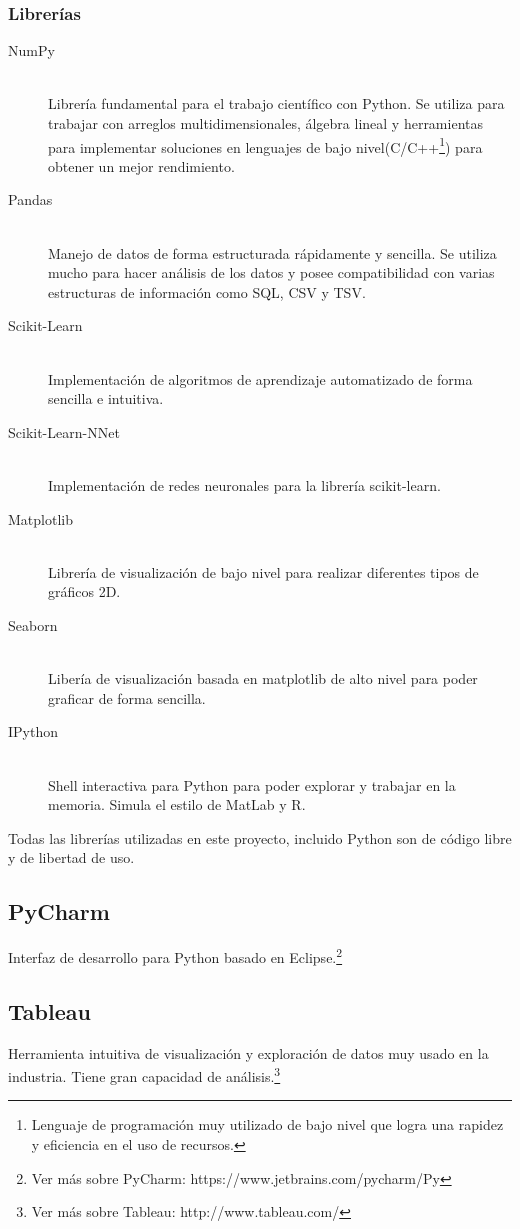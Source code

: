 \subsubsection{Librerías}
\begin{description}
  \item[NumPy] \hfill \\
  Librería fundamental para el trabajo científico con Python. Se utiliza para trabajar con arreglos multidimensionales, álgebra lineal y herramientas para implementar soluciones en lenguajes de bajo nivel(C/C++\footnote{Lenguaje de programación muy utilizado de bajo nivel que logra una rapidez y eficiencia en el uso de recursos.}) para obtener un mejor rendimiento.
  \item[Pandas] \hfill \\
  Manejo de datos de forma estructurada rápidamente y sencilla. Se utiliza mucho para hacer análisis de los datos y posee compatibilidad con varias estructuras de información como SQL, CSV y TSV.
  \item[Scikit-Learn] \cite{scikit-learn} \hfill \\
  Implementación de algoritmos de aprendizaje automatizado de forma sencilla e intuitiva.
  \item[Scikit-Learn-NNet] \hfill \\
  Implementación de redes neuronales para la librería scikit-learn.
  \item[Matplotlib] \hfill \\
  Librería de visualización de bajo nivel para realizar diferentes tipos de gráficos 2D.
  \item[Seaborn] \hfill \\
  Libería de visualización basada en matplotlib de alto nivel para poder graficar de forma sencilla.
  \item[IPython] \hfill \\
  Shell interactiva para Python para poder explorar y trabajar en la memoria. Simula el estilo de MatLab y R.
\end{description}
Todas las librerías utilizadas en este proyecto, incluido Python son de código libre y de libertad de uso.
\subsection{PyCharm}
Interfaz de desarrollo para Python basado en Eclipse.\footnote{Ver más sobre PyCharm: https://www.jetbrains.com/pycharm/Py}
\subsection{Tableau}
Herramienta intuitiva de visualización y exploración de datos muy usado en la industria. Tiene gran capacidad de análisis.\footnote{Ver más sobre Tableau: http://www.tableau.com/}
